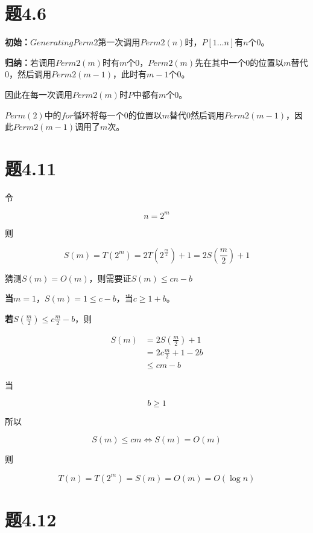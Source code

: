 \documentclass[a4paper,twoside]{article}
\begin{document}
\begin{spacing}{1.2}
\section{题4.6}

\textbf{初始：}$GeneratingPerm2$第一次调用$Perm2(n)$时，$P[1\dots n]$有$n$个$0$。

\textbf{归纳：}若调用$Perm2(m)$时有$m$个$0$，$Perm2(m)$先在其中一个$0$的位置以$m$替代$0$，然后调用$Perm2(m-1)$，此时有$m-1$个$0$。

因此在每一次调用$Perm2(m)$时$P$中都有$m$个$0$。

$Perm(2)$中的$for$循环将每一个$0$的位置以$m$替代$0$然后调用$Perm2(m-1)$，因此$Perm2(m-1)$调用了$m$次。

\section{题4.11}

令

$$
n=2^m
$$

则

$$
S(m)=T(2^m)=2T(2^{\frac{m}{2}})+1=2S(\frac{m}{2})+1
$$

猜测$S(m)=O(m)$，则需要证$S(m)\le cn-b$

\textbf{当$m=1$}，$S(m)=1\le c-b$，当$c \ge 1+b$。

\textbf{若$S(\frac{m}{2})\le c\frac{m}{2}-b$}，则

\begin{align*}
	S(m)&=2S(\frac{m}{2})+1 \\
	&=2c \frac{m}{2}+1-2b \\
	& \le cm-b
\end{align*}

当

$$
b \ge 1
$$

所以

$$
S(m) \le cm \iff S(m)=O(m)
$$

则

$$
T(n)=T(2^m)=S(m)=O(m)=O(\log n)
$$

\section{题4.12}


\end{spacing}
\end{document}
